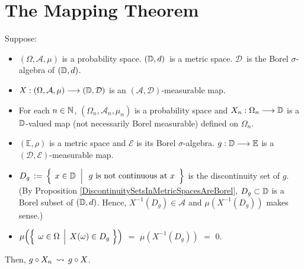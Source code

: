 

\section{The Mapping Theorem}
\setcounter{theorem}{0}
\setcounter{equation}{0}


\renewcommand{\theenumi}{\roman{enumi}}
\renewcommand{\labelenumi}{\textnormal{(\theenumi)}$\;\;$}


\begin{theorem}
\mbox{}\vskip 0.1cm
\noindent
Suppose:
\begin{itemize}
\item
	$(\Omega,\mathcal{A},\mu)$ is a probability space.
	$(\mathbb{D},d)$\, is a metric space.
	$\mathcal{D}$\, is the Borel $\sigma$-algebra of $(\mathbb{D},d)$.
\item
	$X : (\Omega,\mathcal{A},\mu) \longrightarrow (\mathbb{D},\mathcal{D})$
	is an $(\mathcal{A},\mathcal{D})$-measurable map.
\item
	For each $n \in \mathbb{N}$,
	$(\Omega_{n},\mathcal{A}_{n},\mu_{n})$ is a probability space and
	$X_{n} : \Omega_{n} \longrightarrow \mathbb{D}$
	is a $\mathbb{D}$-valued map (not necessarily Borel measurable) defined on $\Omega_{n}$.
\item
	$(\mathbb{E},\rho)$ is a metric space and $\mathcal{E}$ is its Borel $\sigma$-algebra.
	$g : \mathbb{D} \longrightarrow \mathbb{E}$ is a $(\mathcal{D},\mathcal{E})$-measurable map.
\item
	$D_{g} \, := \,
	\left\{\;\left.
		x\overset{{\color{white}.}}{\in}\D
		\;\;\right\vert
		\begin{array}{c}\textnormal{$g$ is not continuous at $x$}\end{array}
		\right\}$
	is the discontinuity set of $g$.
	\vskip 0.1cm
	(By Proposition \ref{DiscontinuitySetsInMetricSpacesAreBorel}, $D_{g} \subset \mathbb{D}$ is a Borel subset of $(\mathbb{D},d)$.
	Hence, $X^{-1}(D_{g}) \in \mathcal{A}$ and $\mu\!\left(X^{-1}(D_{g})\right)$ makes sense.)
\item
	$\mu\!\left(\left\{\;\left.\omega\overset{{\color{white}.}}{\in}\Omega\;\,\right\vert\;X(\omega)\in D_{g}\;\right\}\right)$
	\;$=$\; $\mu\!\left(X^{-1}(D_{g})\right)$
	\;$=$\; $0$.
\end{itemize}
Then, \;$g \circ X_{n} \,\rightsquigarrow\, g \circ X$.
\end{theorem}
\proof

